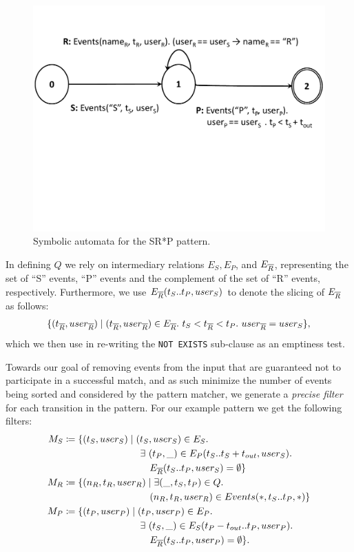 \begin{figure}[t]
	\centering
	\includegraphics[clip, trim=0.5cm 10cm 0.5cm 3cm,width=\columnwidth]
	{graphs/example_sm.pdf}
	\caption{Symbolic automata for the SR*P pattern.}
	\label{fig:srp_pattern}
\end{figure}

In defining $Q$ we rely on intermediary relations 
$E_S, E_P$, and $E_{\overline{R}}$, representing the set of ``S'' events, ``P'' events
and the complement of the set of ``R'' events, respectively.
Furthermore, we use $E_{\overline{R}}(t_S..t_P, user_S)$ to denote the slicing of
$E_{\overline{R}}$ as follows:
\begin{align*}
\{ (t_{\oR}, user_{\oR}) \mid 
(t_{\oR}, user_{\oR}) \in E_{\oR} .\ 
t_S < t_{\oR} < t_P .\ 
user_{\oR} = user_S
\},
\end{align*}
which we then use in re-writing the \texttt{NOT EXISTS} sub-clause as an
emptiness test.


Towards our goal of removing events from the input that are guaranteed not to
participate in a successful match, and as such minimize the number of events
being sorted and considered by the pattern matcher, we
generate a {\em precise filter} for each transition in the pattern. 
For our example pattern we get the following filters:
\begin{align*}
M_S 
&\coloneq 
\{ (t_S, user_S) \mid 
(t_S, user_S) \in E_S .\
\\
&\qqqquad 
\exists\ (t_P, \_) \in E_P(t_S..t_S + t_{out}, user_S) .\ 
\\
&\qqqquad\quad
E_{\oR}(t_S..t_P, user_S) = \emptyset 
\}
\\
M_R 
&\coloneq 
\{ (n_R, t_R, user_R) \mid 
\exists (\_, t_S, t_P) \in Q .\ 
\\
&\qqqquad\quad
(n_R, t_R, user_R) \in Events(*, t_S..t_P, *) 
\}
\\
M_P 
&\coloneq 
\{ (t_P, user_P) \mid  
(t_P, user_P) \in E_P .\ 
\\
&\qqqquad
\exists\ (t_S, \_) \in E_S(t_P-t_{out}..t_P, user_P) .\ 
\\
&\qqqquad\quad
E_{\oR}(t_S..t_P, user_P) = \emptyset 
\}.
\end{align*}

